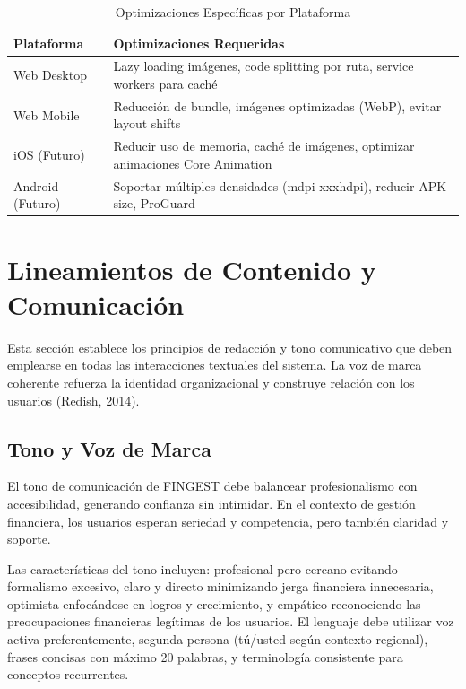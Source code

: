\documentclass[12pt,a4paper,oneside]{article}
\begin{document}
\begin{table}[h]
\centering
\caption{Optimizaciones Específicas por Plataforma}
\label{tab:platform-optimization}
\small
\begin{tabular}{|l|p{9cm}|}
\hline
\textbf{Plataforma} & \textbf{Optimizaciones Requeridas} \\
\hline
Web Desktop & Lazy loading imágenes, code splitting por ruta, service workers para caché \\
\hline
Web Mobile & Reducción de bundle, imágenes optimizadas (WebP), evitar layout shifts \\
\hline
iOS (Futuro) & Reducir uso de memoria, caché de imágenes, optimizar animaciones Core Animation \\
\hline
Android (Futuro) & Soportar múltiples densidades (mdpi-xxxhdpi), reducir APK size, ProGuard \\
\hline
\end{tabular}
\end{table}

\section{Lineamientos de Contenido y Comunicación}

Esta sección establece los principios de redacción y tono comunicativo que deben emplearse en todas las interacciones textuales del sistema. La voz de marca coherente refuerza la identidad organizacional y construye relación con los usuarios (Redish, 2014).

\subsection{Tono y Voz de Marca}

El tono de comunicación de FINGEST debe balancear profesionalismo con accesibilidad, generando confianza sin intimidar. En el contexto de gestión financiera, los usuarios esperan seriedad y competencia, pero también claridad y soporte.

Las características del tono incluyen: profesional pero cercano evitando formalismo excesivo, claro y directo minimizando jerga financiera innecesaria, optimista enfocándose en logros y crecimiento, y empático reconociendo las preocupaciones financieras legítimas de los usuarios. El lenguaje debe utilizar voz activa preferentemente, segunda persona (tú/usted según contexto regional), frases concisas con máximo 20 palabras, y terminología consistente para conceptos recurrentes.
\end{document}
